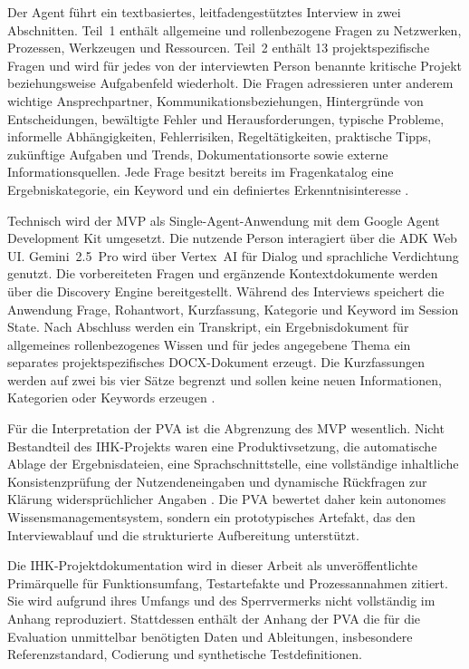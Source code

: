 \documentclass[
  10pt,
  ngerman,
  a4paper,
  toc=graduated,
  numbers=noenddot,
  headings=standardclasses,
  nonumberlist
]{scrartcl}
\begin{document}
Der Agent führt ein textbasiertes, leitfadengestütztes Interview in zwei Abschnitten. Teil~1 enthält allgemeine und rollenbezogene Fragen zu Netzwerken, Prozessen, Werkzeugen und Ressourcen. Teil~2 enthält 13 projektspezifische Fragen und wird für jedes von der interviewten Person benannte kritische Projekt beziehungsweise Aufgabenfeld wiederholt. Die Fragen adressieren unter anderem wichtige Ansprechpartner, Kommunikationsbeziehungen, Hintergründe von Entscheidungen, bewältigte Fehler und Herausforderungen, typische Probleme, informelle Abhängigkeiten, Fehlerrisiken, Regeltätigkeiten, praktische Tipps, zukünftige Aufgaben und Trends, Dokumentationsorte sowie externe Informationsquellen. Jede Frage besitzt bereits im Fragenkatalog eine Ergebniskategorie, ein Keyword und ein definiertes Erkenntnisinteresse \cite[S.~2]{sommer2026projekt}.

Technisch wird der MVP als Single-Agent-Anwendung mit dem Google Agent Development Kit umgesetzt. Die nutzende Person interagiert über die ADK Web UI. Gemini~2.5~Pro wird über Vertex~AI für Dialog und sprachliche Verdichtung genutzt. Die vorbereiteten Fragen und ergänzende Kontextdokumente werden über die Discovery Engine bereitgestellt. Während des Interviews speichert die Anwendung Frage, Rohantwort, Kurzfassung, Kategorie und Keyword im Session State. Nach Abschluss werden ein Transkript, ein Ergebnisdokument für allgemeines rollenbezogenes Wissen und für jedes angegebene Thema ein separates projektspezifisches DOCX-Dokument erzeugt. Die Kurzfassungen werden auf zwei bis vier Sätze begrenzt und sollen keine neuen Informationen, Kategorien oder Keywords erzeugen \cite[S.~9--12]{sommer2026projekt}.

Für die Interpretation der PVA ist die Abgrenzung des MVP wesentlich. Nicht Bestandteil des IHK-Projekts waren eine Produktivsetzung, die automatische Ablage der Ergebnisdateien, eine Sprachschnittstelle, eine vollständige inhaltliche Konsistenzprüfung der Nutzendeneingaben und dynamische Rückfragen zur Klärung widersprüchlicher Angaben \cite[S.~2,~5]{sommer2026projekt}. Die PVA bewertet daher kein autonomes Wissensmanagementsystem, sondern ein prototypisches Artefakt, das den Interviewablauf und die strukturierte Aufbereitung unterstützt.

Die IHK-Projektdokumentation wird in dieser Arbeit als unveröffentlichte Primärquelle für Funktionsumfang, Testartefakte und Prozessannahmen zitiert. Sie wird aufgrund ihres Umfangs und des Sperrvermerks nicht vollständig im Anhang reproduziert. Stattdessen enthält der Anhang der PVA die für die Evaluation unmittelbar benötigten Daten und Ableitungen, insbesondere Referenzstandard, Codierung und synthetische Testdefinitionen.
\end{document}
